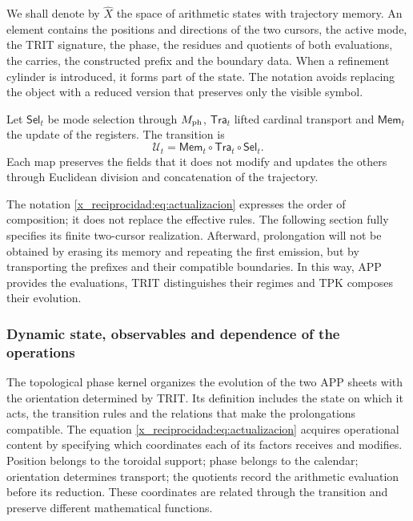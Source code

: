 We shall denote by \(\widehat X\) the space of arithmetic states with trajectory memory. An element contains the positions and directions of the two cursors, the active mode, the TRIT signature, the phase, the residues and quotients of both evaluations, the carries, the constructed prefix and the boundary data. When a refinement cylinder is introduced, it forms part of the state. The notation avoids replacing the object with a reduced version that preserves only the visible symbol.

\begin{definition}
Let \(\mathsf{Sel}_t\) be mode selection through \(M_{\rm ph}\), \(\mathsf{Tra}_t\) lifted cardinal transport and \(\mathsf{Mem}_t\) the update of the registers. The transition is
\begin{equation}
 \mathcal U_t=\mathsf{Mem}_t\circ\mathsf{Tra}_t\circ\mathsf{Sel}_t.
 \label{x_reciprocidad:eq:actualizacion}
\end{equation}
Each map preserves the fields that it does not modify and updates the others through Euclidean division and concatenation of the trajectory.
\end{definition}

The notation \eqref{x_reciprocidad:eq:actualizacion} expresses the order of composition; it does not replace the effective rules. The following section fully specifies its finite two-cursor realization. Afterward, prolongation will not be obtained by erasing its memory and repeating the first emission, but by transporting the prefixes and their compatible boundaries. In this way, APP provides the evaluations, TRIT distinguishes their regimes and TPK composes their evolution.



\subsubsection{Dynamic state, observables and dependence of the operations}
\label{x_reciprocidad:tpk-int:estado}

The topological phase kernel organizes the evolution of the two APP sheets
with the orientation determined by TRIT. Its definition includes the state
on which it acts, the transition rules and the relations that make
the prolongations compatible. The equation \eqref{x_reciprocidad:eq:actualizacion} acquires
operational content by specifying which coordinates each
of its factors receives and modifies. Position belongs to the toroidal support; phase
belongs to the calendar; orientation determines transport; the
quotients record the arithmetic evaluation before its reduction.
These coordinates are related through the transition and preserve different
mathematical functions.

